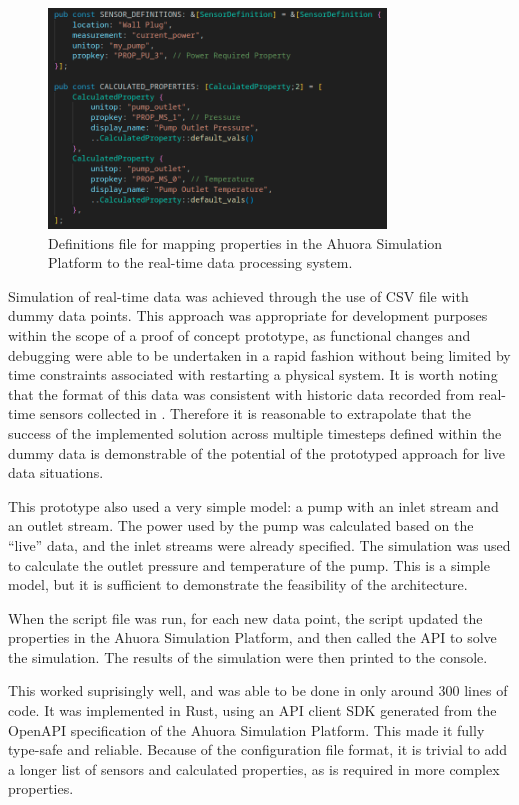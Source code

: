 \begin{figure}
    \centering
    \includegraphics[width=0.8\textwidth]{live_constants.png}
    \caption{Definitions file for mapping properties in the Ahuora Simulation Platform to the real-time data processing system.}
    \label{fig:live-constants}
\end{figure}

Simulation of real-time data was achieved through the use of CSV file with dummy data points.  
This approach was appropriate for development purposes within the scope of a proof of concept prototype, as functional changes and debugging were able to be undertaken in a rapid fashion without being limited by time constraints associated with restarting a physical system. It is worth noting that the format of this data was consistent with historic data recorded from real-time sensors collected in . Therefore it is reasonable to extrapolate that the success of the implemented solution across multiple timesteps defined within the dummy data is demonstrable of the potential of the prototyped approach for live data situations.

This prototype also used a very simple model: a pump with an inlet stream and an outlet stream. 
The power used by the pump was calculated based on the  ``live'' data, and the inlet streams were already specified. 
The simulation was used to calculate the outlet pressure and temperature of the pump. This is a simple model, but it is sufficient to demonstrate the feasibility of the architecture.

When the script file was run, for each new data point, the script updated the properties in the Ahuora Simulation Platform, and then called the API to solve the simulation. The results of the simulation were then printed to the console. 

This worked suprisingly well, and was able to be done in only around 300 lines of code. 
It was implemented in Rust, using an API client SDK generated from the OpenAPI specification of the Ahuora Simulation Platform. 
This made it fully type-safe and reliable. 
Because of the configuration file format, it is trivial to add a longer list of sensors and calculated properties, as is required in more complex properties.

